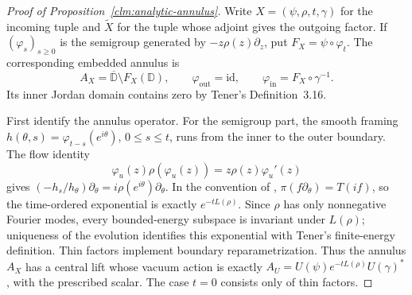 \documentclass[11pt,a4paper]{article}
\theoremstyle{definition}
\begin{document}
\begin{proof}[Proof of Proposition~\ref{clm:analytic-annulus}]
Write $X=(\psi,\rho,t,\gamma)$ for the incoming tuple and
$\widetilde X$ for the tuple whose adjoint gives the outgoing factor.
If $(\varphi_s)_{s\geq0}$ is the semigroup generated by
$-z\rho(z)\partial_z$, put $F_X=\psi\circ\varphi_t$.
The corresponding embedded annulus is
\[
 A_X=\overline{\mathbb D}\setminus F_X(\mathbb D),
 \qquad \varphi_{\mathrm{out}}=\mathrm{id},\qquad
 \varphi_{\mathrm{in}}=F_X\circ\gamma^{-1}.
\]
Its inner Jordan domain contains zero by Tener's Definition~3.16.

First identify the annulus operator.  For the semigroup part, the
smooth framing $h(\theta,s)=\varphi_{t-s}(e^{i\theta})$, $0\leq s\leq t$,
runs from the inner to the outer boundary.  The flow identity
\[
 \varphi_u(z)\rho(\varphi_u(z))
   =z\rho(z)\varphi_u'(z)
\]
gives $(-h_s/h_\theta)\partial_\theta
=i\rho(e^{i\theta})\partial_\theta$.
In the convention of \cite[Remark~4.2]{HTAnn},
$\pi(f\partial_\theta)=T(if)$, so the time-ordered exponential
\cite[formula~(5.2) and Theorem~5.5]{HTAnn} is exactly
$e^{-tL(\rho)}$.  Since $\rho$ has only nonnegative Fourier modes,
every bounded-energy subspace is invariant under $L(\rho)$; uniqueness
of the evolution identifies this exponential with Tener's
finite-energy definition.  Thin factors implement boundary
reparametrization.  Thus the annulus $A_X$ has a central lift whose
vacuum action is exactly
$A_U=U(\psi)e^{-tL(\rho)}U(\gamma)^*$, with the prescribed scalar.
The case $t=0$ consists only of thin factors.


\end{proof}
\end{document}
